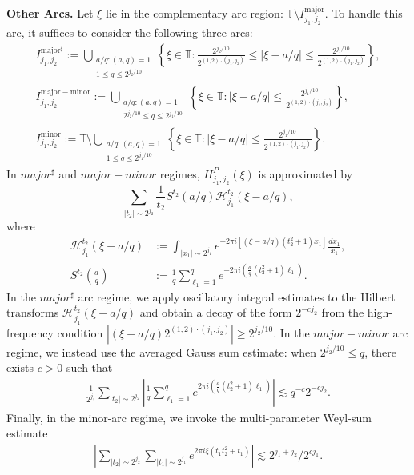 \documentclass[11 pt,letterpaper]{amsart}
\theoremstyle{plain}
\theoremstyle{definition}
\theoremstyle{remark} \theoremstyle{exam} \theoremstyle{ob}
\numberwithin{equation}{section}
\begin{document}
\noindent\textbf{Other Arcs.}
	Let $\xi$ lie  in the complementary arc region:
	$
 \mathbb{T} \setminus I^{\mathrm{major}}_{j_1,j_2}.
	$ To handle this arc, it suffices to consider the following three arcs:
\begin{align}
	I^{\mathrm{major^{\sharp}}}_{j_1,j_2}
	:=
	\bigcup_{\substack{a/q : (a,q)=1 \\ 1\le q \le 2^{j_2/10}}}
	\left\{
	\xi \in \mathbb{T} : \frac{2^{j_2/10}}{2^{(1,2)\cdot(j_1,j_2)}}\le
	|\xi - a/q| \le \frac{2^{j_1/10}}{2^{(1,2)\cdot(j_1,j_2)}}
	\right\},\label{y}\\
		I^{\mathrm{major-minor}}_{j_1,j_2}
	:=
	\bigcup_{\substack{a/q : (a,q)=1 \\ 2^{j_2/10}\le q \le 2^{j_1/10}}}
	\left\{
	\xi \in \mathbb{T} :
	|\xi - a/q| \le \frac{2^{j_1/10}}{2^{(1,2)\cdot(j_1,j_2)}}
	\right\},\label{y1}\\
		I^{\mathrm{minor}}_{j_1,j_2}
	:=\mathbb{T}\setminus
	\bigcup_{\substack{a/q : (a,q)=1 \\ 1\le q \le 2^{j_1/10}}}
	\left\{
	\xi \in \mathbb{T} :
	|\xi - a/q| \le \frac{2^{j_1/10}}{2^{(1,2)\cdot(j_1,j_2)}}
	\right\}.\label{y2}
\end{align}
In  $major^{\sharp}$ and $major-minor$ regimes,   $H_{j_1,j_2}^{P}(\xi)$ is approximated by  $$\sum_{|t_2|\sim 2^{j_2}}\frac{1}{t_2}S^{t_2}(a/q)\mathcal{H}^{t_2}_{j_1}(\xi-a/q),$$ where \begin{align*}
	\mathcal{H}_{j_1}^{t_2}(\xi-a/q)&:=\int_{|x_1|\sim 2^{j_1}} e^{-2\pi i[(\xi-a/q)(t_2^{2}+1) x_1]}\frac{dx_1}{x_1},\\
	S^{t_2}\left(\frac{a}{q}\right)&:=\frac{1}{q}\sum_{\ell_1=1}^q e^{-2\pi i \left(\frac{a}{q}(t_2^{2}+1)\ell_1\right)}.
\end{align*} In the  $major^{\sharp}$ arc regime, we apply oscillatory integral estimates to the Hilbert transforms $\mathcal{H}_{j_1}^{t_2}(\xi-a/q)$ and obtain a decay of the form $2^{-cj_2}$ from the high-frequency condition   $ |(\xi-a/q) 2^{(1,2)\cdot(j_1,j_2)}| \ge 2^{ j_2/10}$.	
 In  the  $major-minor$ arc regime, we instead use the averaged Gauss sum estimate: when  $2^{j_2/10}\le q$, there exists $c>0$ such that \begin{align}\label{u1}
	\frac{1}{2^{j_2}}\sum_{|t_2|\sim 2^{j_2}}\left|\frac{1}{q}\sum_{\ell_1=1}^q e^{2\pi i\left(\frac{a}{q}(t_2^{2}+1)\ell_1\right)}\right|\lesssim q^{-c}2^{-cj_2}.\end{align} Finally, in the minor-arc regime, we invoke the multi-parameter Weyl-sum estimate \begin{align}\label{u2}
	\left|\sum_{|t_2|\sim 2^{j_2}}\sum_{|t_1|\sim 2^{j_1}}e^{2\pi i \xi( t_1t_2^{2}+t_1)}\right|\lesssim 2^{j_1+j_2}/2^{cj_1}.
	\end{align} 
\end{document}
